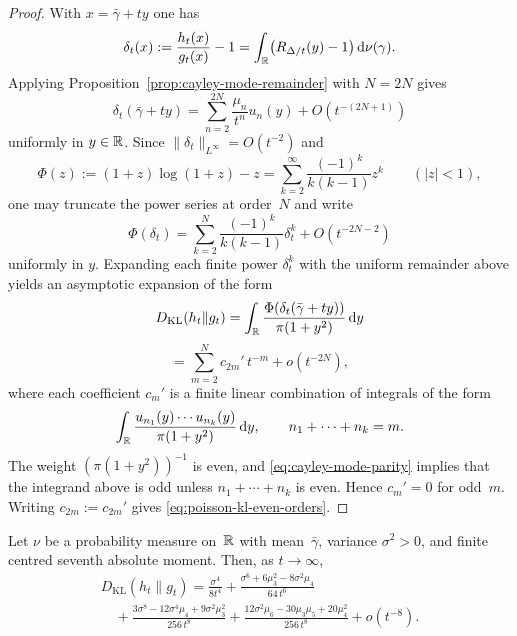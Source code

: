 \begin{proof}
With $x=\bar\gamma+ty$ one has
\[
\delta_t(x):=\frac{h_t(x)}{g_t(x)}-1
=\int_{\mathbb{R}}\bigl(R_{\Delta/t}(y)-1\bigr)\,\mathrm{d}\nu(\gamma).
\]
Applying Proposition~\ref{prop:cayley-mode-remainder} with $N=2N$ gives
\[
\delta_t(\bar\gamma+ty)
=\sum_{n=2}^{2N}\frac{\mu_n}{t^n}u_n(y)+O(t^{-(2N+1)})
\]
uniformly in $y\in\mathbb{R}$.  Since $\|\delta_t\|_{L^\infty}=O(t^{-2})$ and
\[
\Phi(z):=(1+z)\log(1+z)-z
=\sum_{k=2}^{\infty}\frac{(-1)^k}{k(k-1)}z^k
\qquad(|z|<1),
\]
one may truncate the power series at order~$N$ and write
\[
\Phi(\delta_t)
=\sum_{k=2}^{N}\frac{(-1)^k}{k(k-1)}\delta_t^k+O(t^{-2N-2})
\]
uniformly in $y$.  Expanding each finite power $\delta_t^k$ with the
uniform remainder above yields an asymptotic expansion of the form
\[
D_{\mathrm{KL}}(h_t\|g_t)
=\int_{\mathbb{R}}\frac{\Phi(\delta_t(\bar\gamma+ty))}{\pi(1+y^2)}\,\mathrm{d} y
\]
\[
=\sum_{m=2}^{N} c_{2m}'\,t^{-m}+o(t^{-2N}),
\]
where each coefficient $c_m'$ is a finite linear combination of integrals
of the form
\[
\int_{\mathbb{R}}\frac{u_{n_1}(y)\cdots u_{n_k}(y)}{\pi(1+y^2)}\,\mathrm{d} y,
\qquad
n_1+\cdots+n_k=m.
\]
The weight $(\pi(1+y^2))^{-1}$ is even, and
\eqref{eq:cayley-mode-parity} implies that the integrand above is odd
unless $n_1+\cdots+n_k$ is even.  Hence $c_m'=0$ for odd~$m$.  Writing
$c_{2m}:=c_{2m}'$ gives \eqref{eq:poisson-kl-even-orders}.
\end{proof}

\begin{theorem}%
\label{thm:poisson-kl-eighth}
Let $\nu$ be a probability measure on~$\mathbb{R}$ with mean~$\bar\gamma$,
variance $\sigma^2>0$, and finite centred seventh absolute moment.  Then,
as $t\to\infty$,
\begin{equation}\label{eq:poisson-kl-eighth}
\begin{split}
D_{\mathrm{KL}}(h_t\|g_t)
=\frac{\sigma^4}{8t^4}
+\frac{\sigma^6+6\mu_3^2-8\sigma^2\mu_4}{64\,t^6}
\\
\quad
+\frac{3\sigma^8-12\sigma^4\mu_4+9\sigma^2\mu_3^2}{256\,t^8}
+\frac{12\sigma^2\mu_6-30\mu_3\mu_5+20\mu_4^2}{256\,t^8}
+o(t^{-8}).
\end{split}
\end{equation}
\end{theorem}

